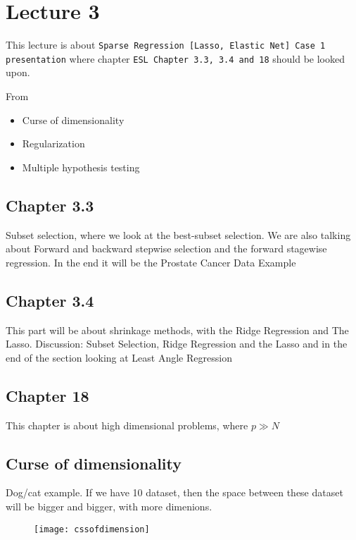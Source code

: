 \chapter{Lecture 3}

This lecture is about \texttt{Sparse Regression
[Lasso, Elastic Net]
Case 1 presentation} where chapter \texttt{ESL Chapter 3.3, 3.4 and
18} should be looked upon.

From \cite{lecture3}
\begin{itemize}
  \item Curse of dimensionality
  \item Regularization
  \item Multiple hypothesis testing
\end{itemize}

\section{Chapter 3.3}

Subset selection, where we look at the best-subset selection. We are also talking about Forward and backward stepwise selection and the forward stagewise regression. In the end it will be the Prostate Cancer Data Example

\section{Chapter 3.4}

This part will be about shrinkage methods, with the Ridge Regression and The Lasso. Discussion: Subset Selection, Ridge Regression and the Lasso and in the end of the section looking at Least Angle Regression

\section{Chapter 18}

This chapter is about high dimensional problems, where $ p \gg N$

\section{Curse of dimensionality}

Dog/cat example. If we have 10 dataset, then the space between these dataset will be bigger and bigger, with more dimenions.

\begin{figure}[H]
  \centering
  \texttt{[image: cssofdimension]}
\end{figure}

